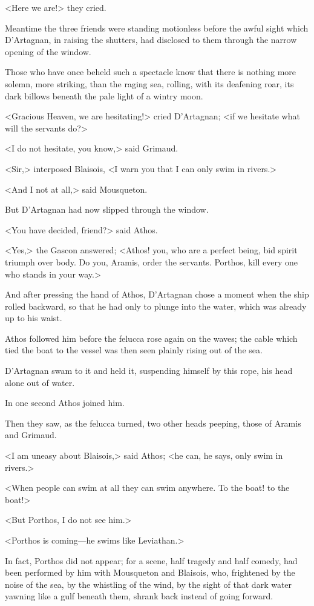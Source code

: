 <Here we are!> they cried.

Meantime the three friends were standing motionless before the awful sight which D'Artagnan, in raising the shutters, had disclosed to them through the narrow opening of the window.

Those who have once beheld such a spectacle know that there is nothing more solemn, more striking, than the raging sea, rolling, with its deafening roar, its dark billows beneath the pale light of a wintry moon.

<Gracious Heaven, we are hesitating!> cried D'Artagnan; <if we hesitate what will the servants do?>

<I do not hesitate, you know,> said Grimaud.

<Sir,> interposed Blaisois, <I warn you that I can only swim in rivers.>

<And I not at all,> said Mousqueton.

But D'Artagnan had now slipped through the window.

<You have decided, friend?> said Athos.

<Yes,> the Gascon answered; <Athos! you, who are a perfect being, bid spirit triumph over body. Do you, Aramis, order the servants. Porthos, kill every one who stands in your way.>

And after pressing the hand of Athos, D'Artagnan chose a moment when the ship rolled backward, so that he had only to plunge into the water, which was already up to his waist.

Athos followed him before the felucca rose again on the waves; the cable which tied the boat to the vessel was then seen plainly rising out of the sea.

D'Artagnan swam to it and held it, suspending himself by this rope, his head alone out of water.

In one second Athos joined him.

Then they saw, as the felucca turned, two other heads peeping, those of Aramis and Grimaud.

<I am uneasy about Blaisois,> said Athos; <he can, he says, only swim in rivers.>

<When people can swim at all they can swim anywhere. To the boat! to the boat!>

<But Porthos, I do not see him.>

<Porthos is coming—he swims like Leviathan.>

In fact, Porthos did not appear; for a scene, half tragedy and half comedy, had been performed by him with Mousqueton and Blaisois, who, frightened by the noise of the sea, by the whistling of the wind, by the sight of that dark water yawning like a gulf beneath them, shrank back instead of going forward.

